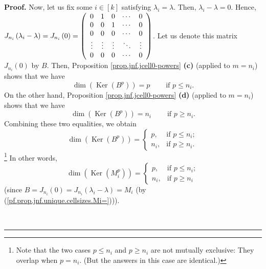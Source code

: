 \documentclass[numbers=enddot,12pt,final,onecolumn,notitlepage]{scrartcl}%
\numberwithin{exer}{subsection}
\theoremstyle{definition}
\newenvironment{proof}[1][Proof]{\noindent\textbf{#1.} }{\ \rule{0.5em}{0.5em}}
\begin{document}
\begin{proof}
Now, let us fix some $i\in\left[  k\right]  $ satisfying $\lambda_{i}=\lambda
$. Then, $\lambda_{i}-\lambda=0$. Hence, $J_{n_{i}}\left(  \lambda_{i}%
-\lambda\right)  =J_{n_{i}}\left(  0\right)  =\left(
\begin{array}
[c]{ccccc}%
0 & 1 & 0 & \cdots & 0\\
0 & 0 & 1 & \cdots & 0\\
0 & 0 & 0 & \cdots & 0\\
\vdots & \vdots & \vdots & \ddots & \vdots\\
0 & 0 & 0 & \cdots & 0
\end{array}
\right)  $. Let us denote this matrix $J_{n_{i}}\left(  0\right)  $ by $B$.
Then, Proposition \ref{prop.jnf.jcell0-powers} \textbf{(c)} (applied to
$m=n_{i}$) shows that we have
\[
\dim\left(  \operatorname*{Ker}\left(  B^{p}\right)  \right)
=p\ \ \ \ \ \ \ \ \ \ \text{if }p\leq n_{i}.
\]
On the other hand, Proposition \ref{prop.jnf.jcell0-powers} \textbf{(d)}
(applied to $m=n_{i}$) shows that we have
\[
\dim\left(  \operatorname*{Ker}\left(  B^{p}\right)  \right)  =n_{i}%
\ \ \ \ \ \ \ \ \ \ \text{if }p\geq n_{i}.
\]
Combining these two equalities, we obtain
\[
\dim\left(  \operatorname*{Ker}\left(  B^{p}\right)  \right)  =%
\begin{cases}
p, & \text{if }p\leq n_{i};\\
n_{i}, & \text{if }p\geq n_{i}.
\end{cases}
\]
\footnote{Note that the two cases $p\leq n_{i}$ and $p\geq n_{i}$ are not
mutually exclusive: They overlap when $p=n_{i}$. (But the answers in this case
are identical.)} In other words,%
\begin{equation}
\dim\left(  \operatorname*{Ker}\left(  M_{i}^{p}\right)  \right)  =%
\begin{cases}
p, & \text{if }p\leq n_{i};\\
n_{i}, & \text{if }p\geq n_{i}%
\end{cases}
\label{pf.prop.jnf.unique.cellsizes.nullity1}%
\end{equation}
(since $B=J_{n_{i}}\left(  0\right)  =J_{n_{i}}\left(  \lambda_{i}%
-\lambda\right)  =M_{i}$ (by (\ref{pf.prop.jnf.unique.cellsizes.Mi=}))).


\end{proof}
\end{document}

